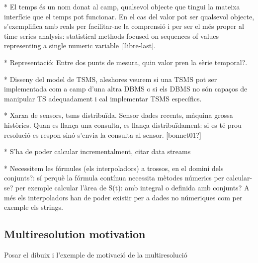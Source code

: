 * El temps és un nom donat al camp, qualsevol objecte que tingui la mateixa interfície que el temps pot funcionar. En el cas del valor pot ser qualsevol objecte, s'exemplifica amb reals per facilitar-ne la comprensió i per ser el més proper al time series analysis: statistical methods focused on sequences of values representing a single numeric variable [llibre-last].




* Representació: Entre dos punts de mesura, quin valor pren la sèrie temporal?.


* Disseny del model de TSMS, aleshores veurem si una TSMS pot ser implementada com a camp d'una altra DBMS o si els DBMS no són capaços de manipular TS adequadament i cal implementar TSMS específics.

* Xarxa de sensors, tsms distribuïda. Sensor dades recents, màquina grossa històrics. Quan es llança una consulta, es llança distribuïdament: si es té prou resolució es respon sinó s'envia la consulta al sensor. [bonnet01?]

* S'ha de poder calcular incrementalment, citar data streams

* Necessitem les fórmules (els interpoladors) a trossos, en el domini dels conjunts?: sí perquè la fórmula contínua necessita mètodes númerics per calcular-se? per exemple calcular l'àrea de S(t): amb integral o definida amb conjunts?
A més els interpoladors han de poder existir per a dades no númeriques com per exemple els strings.






\subsection{Multiresolution motivation}

\todo{}
Posar el dibuix i l'exemple de motivació de la multiresolució















